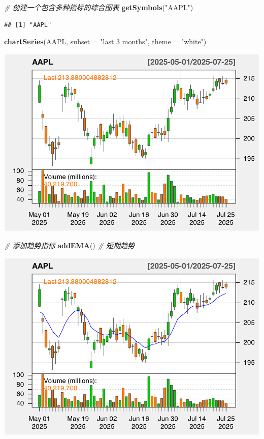 \documentclass[]{ctexbook}
\newenvironment{Shaded}{\begin{snugshade}}{\end{snugshade}}
\newcommand{\AttributeTok}[1]{\textcolor[rgb]{0.13,0.29,0.53}{#1}}
\newcommand{\CommentTok}[1]{\textcolor[rgb]{0.56,0.35,0.01}{\textit{#1}}}
\newcommand{\FunctionTok}[1]{\textcolor[rgb]{0.13,0.29,0.53}{\textbf{#1}}}
\newcommand{\NormalTok}[1]{#1}
\newcommand{\StringTok}[1]{\textcolor[rgb]{0.31,0.60,0.02}{#1}}
\begin{document}
\begin{Shaded}
\begin{Highlighting}[]
\CommentTok{\# 创建一个包含多种指标的综合图表}
\FunctionTok{getSymbols}\NormalTok{(}\StringTok{"AAPL"}\NormalTok{)}
\end{Highlighting}
\end{Shaded}

\begin{verbatim}
## [1] "AAPL"
\end{verbatim}

\begin{Shaded}
\begin{Highlighting}[]
\FunctionTok{chartSeries}\NormalTok{(AAPL, }\AttributeTok{subset =} \StringTok{"last 3 months"}\NormalTok{, }\AttributeTok{theme =} \StringTok{"white"}\NormalTok{)}
\end{Highlighting}
\end{Shaded}

\includegraphics[width=0.9\linewidth]{QuantmodHandbook_files/figure-latex/comprehensive-1}

\begin{Shaded}
\begin{Highlighting}[]
\CommentTok{\# 添加趋势指标}
\FunctionTok{addEMA}\NormalTok{()  }\CommentTok{\# 短期趋势}
\end{Highlighting}
\end{Shaded}

\includegraphics[width=0.9\linewidth]{QuantmodHandbook_files/figure-latex/comprehensive-2}
\end{document}
